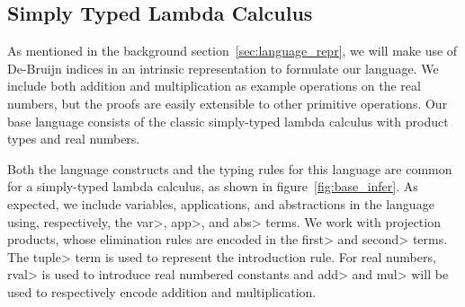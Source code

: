 \subsection{Simply Typed Lambda Calculus}\label{sec:formal_stlc}
  As mentioned in the background section~\ref{sec:language_repr}, we will make use of De-Bruijn indices in an intrinsic representation to formulate our language.
  We include both addition and multiplication as example operations on the real numbers, but the proofs are easily extensible to other primitive operations.
  Our base language consists of the classic simply-typed lambda calculus with product types and real numbers.

  Both the language constructs and the typing rules for this language are common for a simply-typed lambda calculus, as shown in figure~\ref{fig:base_infer}.
  As expected, we include variables, applications, and abstractions in the language using, respectively, the \<var>, \<app>, and \<abs> terms.
  We work with projection products, whose elimination rules are encoded in the  \<first> and \<second> terms. The \<tuple> term is used to represent the introduction rule.
  For real numbers, \<rval> is used to introduce real numbered constants and \<add> and \<mul> will be used to respectively encode addition and multiplication.

